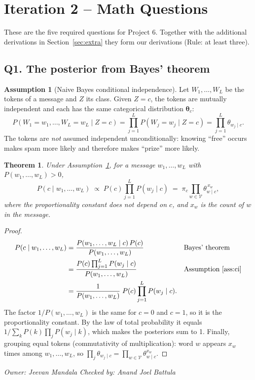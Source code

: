 \documentclass[11pt]{article}
\newcommand{\owner}[2]{\par\noindent\textit{Owner: #1 \hfill Checked by: #2}\par\medskip}
\theoremstyle{plain}
\newtheorem{theorem}{Theorem}
\theoremstyle{definition}
\newtheorem{assumption}{Assumption}
\newcommand{\V}{\mathcal{V}}
\begin{document}
\section{Iteration 2 -- Math Questions}\label{sec:questions}
These are the five required questions for Project 6. Together with the additional derivations in
Section~\ref{sec:extra} they form our derivations (Rule: at least three).

\subsection{Q1. The posterior from Bayes' theorem}\label{sec:q1}

\begin{assumption}[Naive Bayes conditional independence]\label{ass:ci}
Let $W_1,\dots,W_L$ be the tokens of a message and $Z$ its class. Given $Z=c$, the tokens are
mutually independent and each has the same categorical distribution $\boldsymbol\theta_c$:
\[
P(W_1=w_1,\dots,W_L=w_L\mid Z=c)=\prod_{j=1}^{L}P(W_j=w_j\mid Z=c)=\prod_{j=1}^L\theta_{w_j\mid c}.
\]
The tokens are \emph{not} assumed independent unconditionally: knowing ``free'' occurs makes
spam more likely and therefore makes ``prize'' more likely.
\end{assumption}

\begin{theorem}\label{thm:posterior}
Under Assumption~\ref{ass:ci}, for a message $w_1,\dots,w_L$ with $P(w_1,\dots,w_L)>0$,
\[
P(c\mid w_1,\dots,w_L)\;\propto\;P(c)\prod_{j=1}^L P(w_j\mid c)
\;=\;\pi_c\prod_{w\in\V}\theta_{w\mid c}^{\,x_w},
\]
where the proportionality constant does not depend on $c$, and $x_w$ is the count of $w$ in the message.
\end{theorem}
\begin{proof}
\begin{align*}
P(c\mid w_1,\dots,w_L)
&=\frac{P(w_1,\dots,w_L\mid c)\,P(c)}{P(w_1,\dots,w_L)}
&&\text{Bayes' theorem}\\
&=\frac{P(c)\prod_{j=1}^L P(w_j\mid c)}{P(w_1,\dots,w_L)}
&&\text{Assumption~\ref{ass:ci}}\\
&=\frac{1}{P(w_1,\dots,w_L)}\;P(c)\prod_{j=1}^L P(w_j\mid c).
\end{align*}
The factor $1/P(w_1,\dots,w_L)$ is the same for $c=0$ and $c=1$, so it is the proportionality
constant. By the law of total probability it equals
$1/\sum_{k}P(k)\prod_jP(w_j\mid k)$, which makes the posteriors sum to 1. Finally, grouping
equal tokens (commutativity of multiplication): word $w$ appears $x_w$ times among
$w_1,\dots,w_L$, so $\prod_{j}\theta_{w_j\mid c}=\prod_{w\in\V}\theta_{w\mid c}^{x_w}$.
\end{proof}
\owner{Jeevan Mandala}{Anand Joel Battula}
\end{document}
